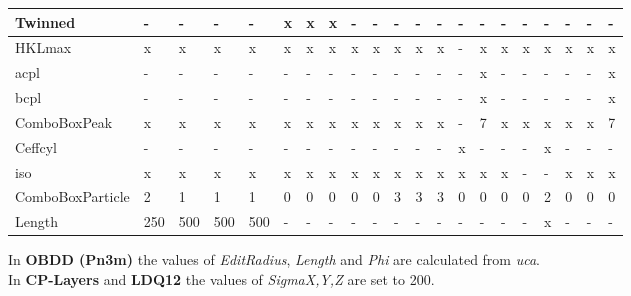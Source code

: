 \documentclass[11pt]{article} %
\begin{document}
\begin{longtable}{|L{3.2cm}|C{0.5cm}|C{0.5cm}|C{0.5cm}|C{0.5cm}|C{0.5cm}|C{0.5cm}|C{0.5cm}|C{0.5cm}|C{0.5cm}|C{0.5cm}|C{0.5cm}|C{0.5cm}|C{0.5cm}|C{0.5cm}|C{0.5cm}|C{0.5cm}|C{0.5cm}|C{0.5cm}|C{0.5cm}|C{0.5cm}|}
Twinned 			& - & - & - & - & x & x & x & - & - & - & - & - & - & - & - & - & - & - & - & - \\ \hline %
HKLmax 			& x & x & x & x & x & x & x & x & x & x & x & x & - & x & x & x & x & x & x & x \\ \hline
acpl 			& - & - & - & - & - & - & - & - & - & - & - & - & - & x & - & - & - & - & - & x \\ \hline
bcpl 			& - & - & - & - & - & - & - & - & - & - & - & - & - & x & - & - & - & - & - & x \\ \hline
ComboBoxPeak 	& x & x & x & x & x & x & x & x & x & x & x & x & - & 7 & x & x & x & x & x & 7 \\ \hline
Ceffcyl 			& - & - & - & - & - & - & - & - & - & - & - & - & x & - & - & - & x & - & - & - \\ \hline %
iso 				& x & x & x & x & x & x & x & x & x & x & x & x & x & x & x & - & - & x & x & x \\ \hline
ComboBoxParticle& 2 & 1 & 1 & 1& 0 & 0 & 0 & 0 & 0 & 3 & 3 & 3 & 0 & 0 & 0 & 0 & 2 & 0 & 0 & 0 \\ \hline
Length & {\small 250} & {\small 500} & {\small 500} & {\small 500} & - & - & - & - & - & - & - & - & - & - & - & - & x & - & - & - \\ \hline
\end{longtable}

In {\bf OBDD (Pn3m)} the values of {\it EditRadius}, {\it Length} and {\it Phi} are calculated from {\it uca}. \\
In {\bf CP-Layers} and {\bf LDQ12} the values of {\it SigmaX,Y,Z} are set to 200.
\end{document}
